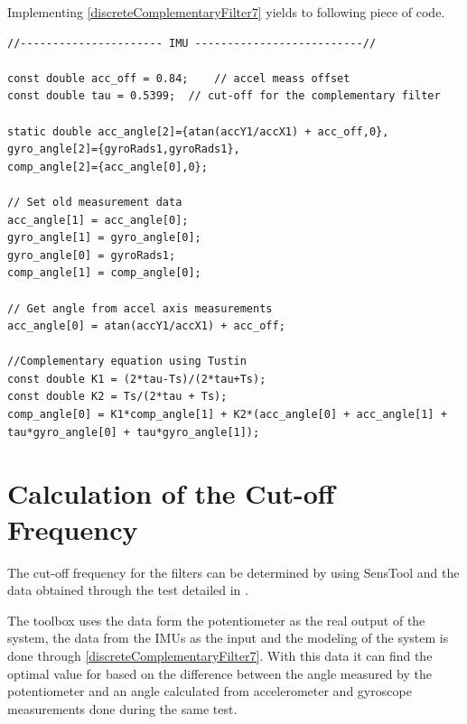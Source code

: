 Implementing \eqref{discreteComplementaryFilter7} yields to following piece of code. 
%

\begin{lstlisting}[caption  = {Code for the implementation of the complementary filter in C\texttt{++}},
label    = codeCompFilter ]
//---------------------- IMU --------------------------//

const double acc_off = 0.84;  	// accel meass offset
const double tau = 0.5399;	// cut-off for the complementary filter

static double acc_angle[2]={atan(accY1/accX1) + acc_off,0},
gyro_angle[2]={gyroRads1,gyroRads1},
comp_angle[2]={acc_angle[0],0};

// Set old measurement data
acc_angle[1] = acc_angle[0];
gyro_angle[1] = gyro_angle[0];
gyro_angle[0] = gyroRads1;
comp_angle[1] = comp_angle[0];

// Get angle from accel axis measurements
acc_angle[0] = atan(accY1/accX1) + acc_off;

//Complementary equation using Tustin
const double K1 = (2*tau-Ts)/(2*tau+Ts);
const double K2 = Ts/(2*tau + Ts);
comp_angle[0] = K1*comp_angle[1] + K2*(acc_angle[0] + acc_angle[1] + tau*gyro_angle[0] + tau*gyro_angle[1]);
\end{lstlisting}

\section{Calculation of the Cut-off Frequency}
The cut-off frequency for the filters can be determined by using SensTool and the data obtained through the test detailed in . 

The toolbox uses the data form the potentiometer as the real output of the system, the data from the IMUs as the input and the modeling of the system is done through \eqref{discreteComplementaryFilter7}. With this data it can find the optimal value for \si{\tau} based on the difference between the angle measured by the potentiometer and an angle calculated from accelerometer and gyroscope measurements done during the same test.

